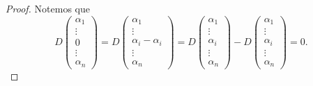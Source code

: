 \documentclass[12pt,a4paper]{book}
\begin{document}
    \begin{proof}
        Notemos que
        \begin{equation*}
        D
        \begin{pmatrix}
        \alpha_{1}\\
        \vdots\\
        0\\
        \vdots\\
        \alpha_{n}
    \end{pmatrix} = D
    \begin{pmatrix}
        \alpha_{1}\\
        \vdots\\
        \alpha_{i} - \alpha_{i}\\
        \vdots\\
        \alpha_{n}
    \end{pmatrix} = D
    \begin{pmatrix}
        \alpha_{1}\\
        \vdots\\
        \alpha_{i}\\
        \vdots\\
        \alpha_{n}
    \end{pmatrix} - D
    \begin{pmatrix}
        \alpha_{1}\\
        \vdots\\
        \alpha_{i}\\
        \vdots\\
        \alpha_{n}
    \end{pmatrix} = 0.
        \end{equation*}
    \end{proof}
\end{document}
